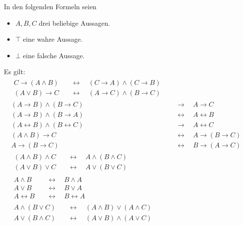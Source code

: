 In den folgenden Formeln seien
\begin{itemize}
    \item $A,B,C$ drei beliebige Aussagen.
    \item $\top$ eine wahre Aussage.
    \item $\bot$ eine falsche Aussage.
\end{itemize}
Es gilt:
\begingroup
\allowdisplaybreaks
\begin{align*}
    \begin{split}
        C\to (A\land B) & \quad\leftrightarrow\quad (C\to A) \land (C\to B) \\
        (A\lor B) \to C & \quad\leftrightarrow\quad (A\to C) \land (B\to C)
    \end{split} \\[0.8em]
    (A \to B) \land (B \to C) & \quad \to\quad A \to C \\ 
    (A \to B) \land (B \to A) & \quad\leftrightarrow\quad A \leftrightarrow B \\
    (A\leftrightarrow B)\land (B\leftrightarrow C) & \quad \to\quad A\leftrightarrow C \\[0.8em]
    (A \land B) \to C & \quad\leftrightarrow\quad A \to (B \to C) \\
    A \to (B \to C) & \quad\leftrightarrow\quad  B \to (A \to C) \\[0.8em]
    \begin{split}
        (A \land B) \land C & \quad\leftrightarrow\quad A \land (B \land C) \\
        (A \lor B) \lor C & \quad\leftrightarrow\quad  A \lor (B \lor C)
    \end{split} \tag{Assoziativgesetze} \\[0.8em]
    \begin{split}
        A \land B & \quad\leftrightarrow\quad  B \land A \\
        A \lor B & \quad\leftrightarrow\quad  B \lor A \\
        A\leftrightarrow B &\quad\leftrightarrow\quad  B \leftrightarrow A
    \end{split} \tag{Kommutativgesetze} \\[0.8em]
    \begin{split} A \land (B \lor C) & \quad\leftrightarrow\quad  (A \land B) \lor (A \land C) \\
        A \lor (B \land C) & \quad\leftrightarrow\quad  (A \lor B) \land (A \lor C)
    \end{split} \tag{Distributivgesetze} \\[0.8em]

\end{align*}
